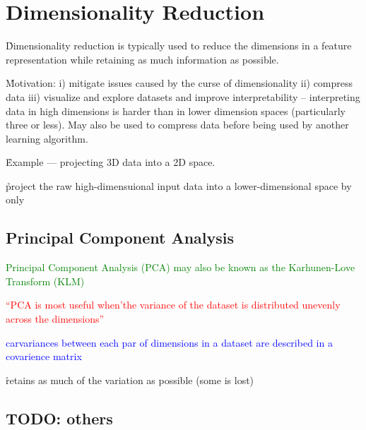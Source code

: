 \section{Dimensionality Reduction}

\r{Dimensionality reduction is typically used to reduce the dimensions in a feature representation while retaining as much information as possible.}

\r{Motivation: i) mitigate issues caused by the curse of dimensionality ii) compress data iii) visualize and explore datasets and improve interpretability -- interpreting data in high dimensions is harder than in lower dimension spaces (particularly three or less). May also be used to compress data before being used by another learning algorithm.}

\r{Example --- projecting 3D data into a 2D space.}

\r{project the raw high-dimensuional input data into  a lower-dimensional space by only }


\subsection{Principal Component Analysis}

\textcolor{green}{{Principal Component Analysis (PCA)} may also be known as the {Karhunen-Love Transform (KLM)} }

\textcolor{red}{``PCA is most useful when'the variance of the dataset is distributed unevenly across the dimensions'' }

\textcolor{blue}{carvariances between each par of dimensions in a dataset are described in a {covarience matrix} }

\r{retains as much of the variation as possible (some is lost)}


\subsection{TODO: others}


